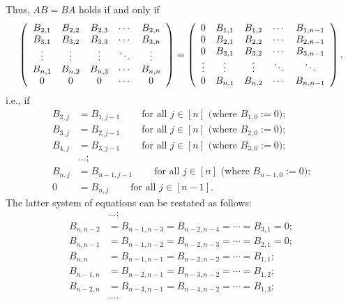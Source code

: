 \documentclass[numbers=enddot,12pt,final,onecolumn,notitlepage]{scrartcl}%
\numberwithin{exer}{subsection}
\theoremstyle{definition}
\begin{document}
Thus, $AB=BA$ holds if and only if
\[
\left(
\begin{array}
[c]{ccccc}%
B_{2,1} & B_{2,2} & B_{2,3} & \cdots & B_{2,n}\\
B_{3,1} & B_{3,2} & B_{3,3} & \cdots & B_{3,n}\\
\vdots & \vdots & \vdots & \ddots & \vdots\\
B_{n,1} & B_{n,2} & B_{n,3} & \cdots & B_{n,n}\\
0 & 0 & 0 & \cdots & 0
\end{array}
\right)  =\left(
\begin{array}
[c]{ccccc}%
0 & B_{1,1} & B_{1,2} & \cdots & B_{1,n-1}\\
0 & B_{2,1} & B_{2,2} & \cdots & B_{2,n-1}\\
0 & B_{3,1} & B_{3,2} & \cdots & B_{3,n-1}\\
\vdots & \vdots & \vdots & \ddots & \ddots\\
0 & B_{n,1} & B_{n,2} & \cdots & B_{n,n-1}%
\end{array}
\right)  ,
\]
i.e., if%
\begin{align*}
B_{2,j}  &  =B_{1,j-1}\ \ \ \ \ \ \ \ \ \ \text{for all }j\in\left[  n\right]
\text{ (where }B_{1,0}:=0\text{);}\\
B_{3,j}  &  =B_{2,j-1}\ \ \ \ \ \ \ \ \ \ \text{for all }j\in\left[  n\right]
\text{ (where }B_{2,0}:=0\text{);}\\
B_{4,j}  &  =B_{3,j-1}\ \ \ \ \ \ \ \ \ \ \text{for all }j\in\left[  n\right]
\text{ (where }B_{3,0}:=0\text{);}\\
&  \ldots;\\
B_{n,j}  &  =B_{n-1,j-1}\ \ \ \ \ \ \ \ \ \ \text{for all }j\in\left[
n\right]  \text{ (where }B_{n-1,0}:=0\text{);}\\
0  &  =B_{n,j}\ \ \ \ \ \ \ \ \ \ \text{for all }j\in\left[  n-1\right]  .
\end{align*}
The latter system of equations can be restated as follows:%
\begin{align*}
&  \ldots;\\
B_{n,n-2}  &  =B_{n-1,n-3}=B_{n-2,n-4}=\cdots=B_{3,1}=0;\\
B_{n,n-1}  &  =B_{n-1,n-2}=B_{n-2,n-3}=\cdots=B_{2,1}=0;\\
B_{n,n}  &  =B_{n-1,n-1}=B_{n-2,n-2}=\cdots=B_{1,1};\\
B_{n-1,n}  &  =B_{n-2,n-1}=B_{n-3,n-2}=\cdots=B_{1,2};\\
B_{n-2,n}  &  =B_{n-3,n-1}=B_{n-4,n-2}=\cdots=B_{1,3};\\
&  \ldots.
\end{align*}
\end{document}
